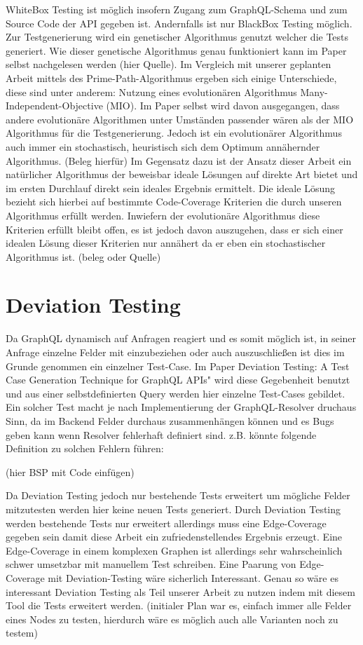 WhiteBox Testing ist möglich insofern Zugang zum GraphQL-Schema und zum Source Code der API gegeben ist. Andernfalls ist
nur BlackBox Testing möglich. Zur Testgenerierung wird ein genetischer Algorithmus genutzt welcher die Tests generiert.
Wie dieser genetische Algorithmus genau funktioniert kann im Paper selbst nachgelesen werden (hier Quelle).
Im Vergleich mit unserer geplanten Arbeit mittels des Prime-Path-Algorithmus ergeben sich einige Unterschiede, diese sind
unter anderem: Nutzung eines evolutionären Algorithmus Many-Independent-Objective (MIO).
Im Paper selbst wird davon ausgegangen, dass andere evolutionäre Algorithmen unter Umständen passender wären als der MIO Algorithmus
für die Testgenerierung. Jedoch ist ein evolutionärer Algorithmus auch immer ein stochastisch, heuristisch sich dem Optimum annähernder Algorithmus. (Beleg hierfür)
Im Gegensatz dazu ist der Ansatz dieser Arbeit ein natürlicher Algorithmus der beweisbar ideale Lösungen auf direkte Art bietet
und im ersten Durchlauf direkt sein ideales Ergebnis ermittelt. Die ideale Lösung bezieht sich hierbei auf bestimmte
Code-Coverage Kriterien die durch unseren Algorithmus erfüllt werden.  Inwiefern der evolutionäre Algorithmus diese
Kriterien erfüllt bleibt offen, es ist jedoch davon auszugehen, dass er sich einer idealen Lösung dieser Kriterien nur
annähert da er eben ein stochastischer Algorithmus ist. (beleg oder Quelle)

\section{Deviation Testing}

Da GraphQL dynamisch auf Anfragen reagiert und es somit möglich ist, in seiner Anfrage einzelne Felder mit einzubeziehen
oder auch auszuschließen ist dies im Grunde genommen ein einzelner Test-Case.
Im Paper \" Deviation Testing: A Test Case Generation Technique for GraphQL APIs" wird diese Gegebenheit benutzt und
aus einer selbstdefinierten Query werden hier einzelne Test-Cases gebildet. Ein solcher Test macht je nach Implementierung
der GraphQL-Resolver druchaus Sinn, da im Backend Felder durchaus zusammenhängen können und es Bugs geben kann wenn
Resolver fehlerhaft definiert sind. z.B. könnte folgende Definition zu solchen Fehlern führen:

(hier BSP mit Code einfügen)

Da Deviation Testing jedoch nur bestehende Tests erweitert um mögliche Felder mitzutesten werden hier keine neuen Tests generiert.
Durch Deviation Testing werden bestehende Tests nur erweitert allerdings muss eine Edge-Coverage gegeben sein damit diese Arbeit
ein zufriedenstellendes Ergebnis erzeugt. Eine Edge-Coverage in einem komplexen Graphen ist allerdings sehr wahrscheinlich
schwer umsetzbar mit manuellem Test schreiben. Eine Paarung von Edge-Coverage mit Deviation-Testing wäre sicherlich Interessant.
Genau so wäre es interessant Deviation Testing als Teil unserer Arbeit zu nutzen indem mit diesem Tool die Tests erweitert werden.
(initialer Plan war es, einfach immer alle Felder eines Nodes zu testen, hierdurch wäre es möglich auch alle Varianten noch zu testem)


